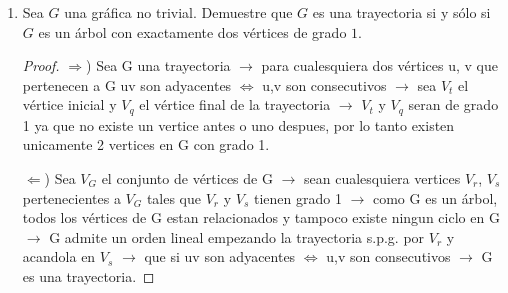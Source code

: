 \documentclass{article}
\begin{document}
\begin{enumerate}
  \item Sea $G$ una gr\'afica no trivial.   Demuestre
    que $G$ es una trayectoria si y s\'olo si $G$ es
    un \'arbol con exactamente dos v\'ertices de
    grado $1$.
    
    \begin{proof} 


      $\Longrightarrow$) Sea G una trayectoria $\rightarrow$ para cualesquiera dos vértices u, v que pertenecen  a G uv son adyacentes $\Leftrightarrow$ u,v son consecutivos  $\rightarrow$ sea $V_t$ el  vértice inicial y $V_q$ el  vértice final de la trayectoria  $\rightarrow$ $V_t$ y $V_q$ seran de grado 1 ya que no existe un vertice antes o uno despues, por lo tanto existen unicamente 2 vertices en G con grado 1.
      
      $\Longleftarrow$) Sea  $V_G$ el conjunto de vértices de G $\rightarrow$ sean cualesquiera vertices $V_r$, $V_s$ pertenecientes a $V_G$ tales que $V_r$ y $V_s$ tienen grado 1 $\rightarrow$  como G es un árbol, todos los vértices de G estan relacionados y tampoco existe ningun  ciclo en G $\rightarrow$  G admite un orden lineal empezando la trayectoria s.p.g. por $V_r$ y acandola en $V_s$ $\rightarrow$ que si uv son adyacentes  $\Leftrightarrow$ u,v son consecutivos  $\rightarrow$ G es una trayectoria.
      

\end{proof}
\end{enumerate}
\end{document}
